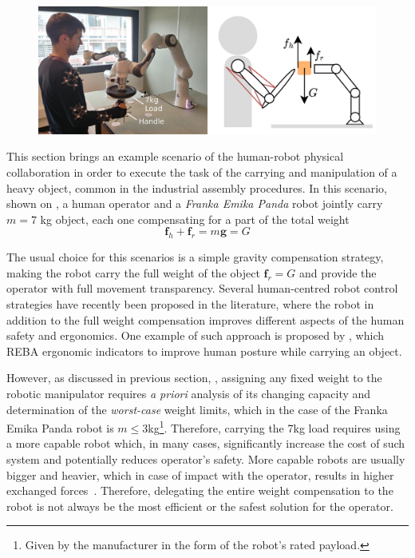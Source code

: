 \begin{figure}[!h]
    \centering
    \includegraphics[width=\linewidth]{Papers/images/exp2_real_schema.jpg}
    \caption{}
    \label{fig:exp2_real_schema}
\end{figure}

This section brings an example scenario of the human-robot physical collaboration in order to execute the task of the carrying and manipulation of a heavy object, common in the industrial assembly procedures. In this scenario, shown on , a human operator and a \textit{Franka Emika Panda} robot jointly carry $m\!=\!7$ kg object, each one compensating for a part of the total weight 
\begin{equation}
    \bm{f}_h  + \bm{f}_r = m\bm{g} = G
\end{equation}

The usual choice for this scenarios is a simple gravity compensation strategy, making the robot carry the full weight of the object $\bm{f}_r = G$ and provide the operator with full movement transparency. Several human-centred robot control strategies have recently been proposed in the literature, where the robot in addition to the full weight compensation improves different aspects of the human safety and ergonomics. One example of such approach is proposed by \citet{ferraguti2020unified}, which REBA \cite{reba} ergonomic indicators to improve human posture while carrying an object. 

However, as discussed in previous section, , assigning any fixed weight to the robotic manipulator requires \textit{a priori} analysis of its changing capacity and determination of the \textit{worst-case} weight limits, which in the case of the Franka Emika Panda robot is $m\leq3$kg\footnote{Given by the manufacturer in the form of the robot's rated payload.}. Therefore, carrying the 7kg load requires using a more capable robot which, in many cases, significantly increase the cost of such system and potentially reduces operator's safety. More capable robots are usually bigger and heavier, which in case of impact with the operator, results in higher exchanged forces~\cite{smu}.
Therefore, delegating the entire weight compensation to the robot is not always be the most efficient or the safest solution for the operator. 

